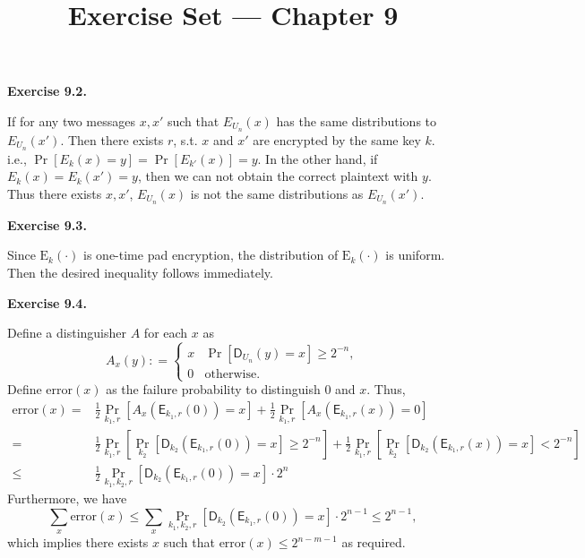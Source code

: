 \documentclass[a4paper]{article}
\title{Exercise Set --- Chapter 9}
\date{}
\newenvironment{exercise}[1]{
	\par
	\noindent\textbf{Exercise #1.}\quad
}{
	\par
	\bigskip
}
\def\sD{\textsf{D}}
\def\sE{\textsf{E}}
\begin{document}
    \maketitle

	\begin{exercise}{9.2}
		If for any two messages $x,x'$ such that $E_{U_{n}}(x)$ has the same distributions to $E_{U_{n}}(x')$. Then there exists $r$, s.t. $x$ and $x'$ are encrypted by the same key $k$. i.e., $\Pr[E_{k}(x) = y] = \Pr[E_{k'}(x)] = y$. In the other hand, if $E_{k}(x) = E_{k}(x') = y$, then we can not obtain the correct plaintext with $y$. Thus there exists $x,x'$, $E_{U_{n}}(x)$ is not the same distributions as $E_{U_{n}}(x')$. 
	\end{exercise}

	\begin{exercise}{9.3}
        Since $\mathrm E_k(\cdot)$ is one-time pad encryption, the distribution of $\mathrm E_k(\cdot)$ is uniform.
        Then the desired inequality follows immediately.
	\end{exercise}

	\begin{exercise}{9.4}
		Define a distinguisher $A$ for each $x$ as 
		\[
			A_x(y): = \left\{\begin{array}{cl}
				x & \Pr[\sD_{U_n}(y) = x] \geq 2^{-n},\\
				0 & \text{otherwise.}
			\end{array}\right.
		\]
		Define $\text{error}(x)$ as the failure probability to distinguish $0$ and $x$. Thus,
		\begin{align*}
			\text{error}(x) 
				= &\frac12 \Pr_{k_1,r} [A_x(\sE_{k_1,r}(0))=x] + \frac12 \Pr_{k_1,r} [A_x(\sE_{k_1,r}(x))=0]\\
				= &\frac12 \Pr_{k_1,r} \left[\Pr_{k_2}[\sD_{k_2}(\sE_{k_1,r}(0))=x] \geq 2^{-n}\right] + \frac12 \Pr_{k_1,r} \left[\Pr_{k_2}[\sD_{k_2}(\sE_{k_1,r}(x))=x] < 2^{-n}\right]\\
				\leq &\frac12 \Pr_{k_1,k_2,r} \left[\sD_{k_2}(\sE_{k_1,r}(0))=x\right]\cdot 2^n
		\end{align*}
		Furthermore, we have
		\[
			\sum_x \text{error}(x) \leq \sum_x \Pr_{k_1,k_2,r} \left[\sD_{k_2}(\sE_{k_1,r}(0))=x\right]\cdot 2^{n - 1} \leq 2^{n - 1},
		\]
		which implies there exists $x$ such that $\text{error}(x) \leq 2^{n - m - 1}$ as required.
	\end{exercise}
\end{document}
